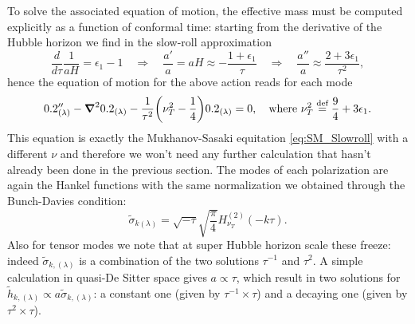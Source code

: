 To solve the associated equation of motion, the effective mass must be computed explicitly as a function of conformal time: starting from the derivative of the Hubble horizon we find in the slow-roll approximation
$$\frac{d}{d\tau}\frac{1}{aH}=\epsilon_1-1\quad\Rightarrow\quad \frac{a'}{a}=aH\approx-\frac{1+\epsilon_1}{\tau}\quad\Rightarrow\quad\frac{a''}{a}\approx\frac{2+3\epsilon_1}{\tau^2},$$
hence the equation of motion for the above action reads for each mode
\begin{equation}
    0.2''_{(\lambda)}-\boldsymbol\nabla^20.2_{(\lambda)}-\frac{1}{\tau^2}\bigg(\nu_T^2-\frac{1}{4}\bigg)0.2_{(\lambda)}=0,\quad\text{where }\nu_T^2\stackrel{\text{def}}{=}\frac{9}{4}+3\epsilon_1.
\end{equation}
This equation is exactly the Mukhanov-Sasaki equitation \eqref{eq:SM_Slowroll} with a different $\nu$ and therefore we won't need any further calculation that hasn't already been done in the previous section. The modes of each polarization are again the Hankel functions with the same normalization we obtained through the Bunch-Davies condition:
$$\tilde\sigma_{k(\lambda)}=\sqrt{-\tau}\sqrt{\frac{\pi}{4}}H_{\nu_T}^{(2)}(-k\tau).$$
Also for tensor modes we note that at super Hubble horizon scale these freeze: indeed $\tilde\sigma_{k,(\lambda)}$ is a combination of the two solutions $ \tau^{-1}$ and $\tau^2$. A simple calculation in quasi-De Sitter space gives $a\propto\tau$, which result in two solutions for $\tilde h_{k,(\lambda)}\propto a\tilde\sigma_{k,(\lambda)}$: a constant one (given by $\tau^{-1}\times\tau$) and a decaying one (given by $\tau^2\times\tau$).
 
